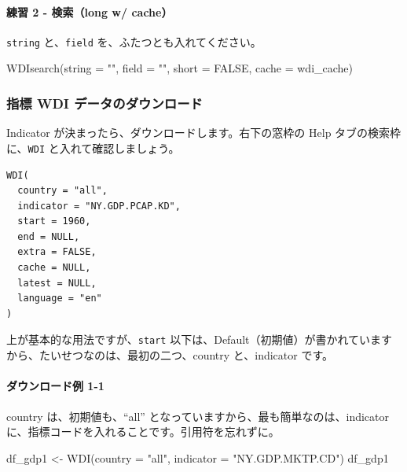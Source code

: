 \documentclass[
]{bxjsbook}
\newenvironment{Shaded}{\begin{snugshade}}{\end{snugshade}}
\newcommand{\AttributeTok}[1]{\textcolor[rgb]{0.77,0.63,0.00}{#1}}
\newcommand{\ConstantTok}[1]{\textcolor[rgb]{0.00,0.00,0.00}{#1}}
\newcommand{\FunctionTok}[1]{\textcolor[rgb]{0.00,0.00,0.00}{#1}}
\newcommand{\NormalTok}[1]{#1}
\newcommand{\OtherTok}[1]{\textcolor[rgb]{0.56,0.35,0.01}{#1}}
\newcommand{\StringTok}[1]{\textcolor[rgb]{0.31,0.60,0.02}{#1}}
\theoremstyle{definition}
\theoremstyle{definition}
\theoremstyle{definition}
\theoremstyle{definition}
\theoremstyle{remark}
\begin{document}
\hypertarget{ux7df4ux7fd2-2---ux691cux7d22long-w-cache}{%
\paragraph{練習 2 - 検索（long w/ cache）}\label{ux7df4ux7fd2-2---ux691cux7d22long-w-cache}}

\texttt{string} と、\texttt{field} を、ふたつとも入れてください。

\begin{Shaded}
\begin{Highlighting}[]
\FunctionTok{WDIsearch}\NormalTok{(}\AttributeTok{string =} \StringTok{""}\NormalTok{, }\AttributeTok{field =} \StringTok{""}\NormalTok{, }\AttributeTok{short =} \ConstantTok{FALSE}\NormalTok{, }\AttributeTok{cache =}\NormalTok{ wdi\_cache)}
\end{Highlighting}
\end{Shaded}

\hypertarget{ux6307ux6a19-wdi-ux30c7ux30fcux30bfux306eux30c0ux30a6ux30f3ux30edux30fcux30c9}{%
\subsubsection{指標 WDI データのダウンロード}\label{ux6307ux6a19-wdi-ux30c7ux30fcux30bfux306eux30c0ux30a6ux30f3ux30edux30fcux30c9}}

Indicator が決まったら、ダウンロードします。右下の窓枠の Help タブの検索枠に、\texttt{WDI} と入れて確認しましょう。

\begin{verbatim}
WDI(
  country = "all",
  indicator = "NY.GDP.PCAP.KD",
  start = 1960,
  end = NULL,
  extra = FALSE,
  cache = NULL,
  latest = NULL,
  language = "en"
)
\end{verbatim}

上が基本的な用法ですが、\texttt{start} 以下は、Default（初期値）が書かれていますから、たいせつなのは、最初の二つ、country と、indicator です。

\hypertarget{ux30c0ux30a6ux30f3ux30edux30fcux30c9ux4f8b-1-1}{%
\paragraph{ダウンロード例 1-1}\label{ux30c0ux30a6ux30f3ux30edux30fcux30c9ux4f8b-1-1}}

country は、初期値も、``all'' となっていますから、最も簡単なのは、indicator に、指標コードを入れることです。引用符を忘れずに。

\begin{Shaded}
\begin{Highlighting}[]
\NormalTok{df\_gdp1 }\OtherTok{\textless{}{-}} \FunctionTok{WDI}\NormalTok{(}\AttributeTok{country =} \StringTok{"all"}\NormalTok{, }\AttributeTok{indicator =} \StringTok{"NY.GDP.MKTP.CD"}\NormalTok{)}
\NormalTok{df\_gdp1}
\end{Highlighting}
\end{Shaded}
\end{document}
